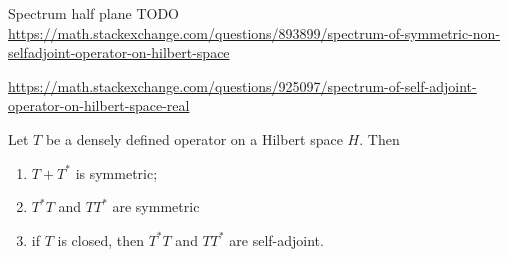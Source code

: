 \begin{example}
Spectrum half plane TODO \url{https://math.stackexchange.com/questions/893899/spectrum-of-symmetric-non-selfadjoint-operator-on-hilbert-space}

\url{https://math.stackexchange.com/questions/925097/spectrum-of-self-adjoint-operator-on-hilbert-space-real}
\end{example}

\begin{proposition}
Let $T$ be a densely defined operator on a Hilbert space $H$. Then
\begin{enumerate}
\item $T+T^*$ is symmetric;
\item $T^*T$ and $TT^*$ are symmetric
\item if $T$ is closed, then $T^*T$ and $TT^*$ are self-adjoint.
\end{enumerate}
\end{proposition}
